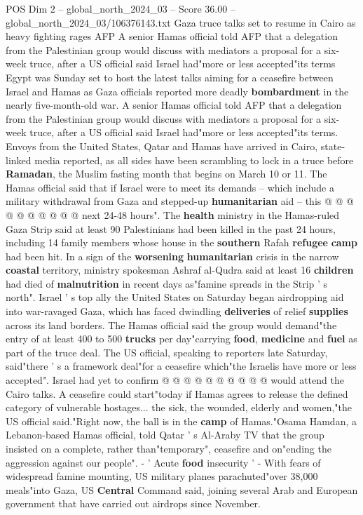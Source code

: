 \begin{textsample}{POS Dim 2 – global\_north\_2024\_03 – Score 36.00 – global\_north\_2024\_03/106376143.txt}  \label{ex:f2_pos_101}
Gaza truce talks set to resume in Cairo as heavy fighting rages AFP A senior Hamas official told AFP that a delegation from the Palestinian group would discuss with mediators a proposal for a six-week truce, after a US official said Israel had"more or less accepted"its terms Egypt was Sunday set to host the latest talks aiming for a ceasefire between Israel and Hamas as Gaza officials reported more deadly \textbf{bombardment} in the nearly five-month-old war.
A senior Hamas official told AFP that a delegation from the Palestinian group would discuss with mediators a proposal for a six-week truce, after a US official said Israel had"more or less accepted"its terms.
Envoys from the United States, Qatar and Hamas have arrived in Cairo, state-linked media reported, as all sides have been scrambling to lock in a truce before \textbf{Ramadan}, the Muslim fasting month that begins on March 10 or 11.
The Hamas official said that if Israel were to meet its demands -- which include a military withdrawal from Gaza and stepped-up \textbf{humanitarian} aid -- this @ @ @ @ @ @ @ @ @ @ next 24-48 hours".
The \textbf{health} ministry in the Hamas-ruled Gaza Strip said at least 90 Palestinians had been killed in the past 24 hours, including 14 family members whose house in the \textbf{southern} Rafah \textbf{refugee} \textbf{camp} had been hit.
In a sign of the \textbf{worsening} \textbf{humanitarian} crisis in the narrow \textbf{coastal} territory, ministry spokesman Ashraf al-Qudra said at least 16 \textbf{children} had died of \textbf{malnutrition} in recent days as"famine spreads in the Strip ' s north".
Israel ' s top ally the United States on Saturday began airdropping aid into war-ravaged Gaza, which has faced dwindling \textbf{deliveries} of relief \textbf{supplies} across its land borders.
The Hamas official said the group would demand"the entry of at least 400 to 500 \textbf{trucks} per day"carrying \textbf{food}, \textbf{medicine} and \textbf{fuel} as part of the truce deal.
The US official, speaking to reporters late Saturday, said"there ' s a framework deal"for a ceasefire which"the Israelis have more or less accepted".
Israel had yet to confirm @ @ @ @ @ @ @ @ @ @ would attend the Cairo talks.
A ceasefire could start"today if Hamas agrees to release the defined category of vulnerable hostages... the sick, the wounded, elderly and women,"the US official said."Right now, the ball is in the \textbf{camp} of Hamas."Osama Hamdan, a Lebanon-based Hamas official, told Qatar ' s Al-Araby TV that the group insisted on a complete, rather than"temporary", ceasefire and on"ending the aggression against our people". - ' Acute \textbf{food} insecurity ' - With fears of widespread famine mounting, US military planes parachuted"over 38,000 meals"into Gaza, US \textbf{Central} Command said, joining several Arab and European government that have carried out airdrops since November.

\end{textsample}
